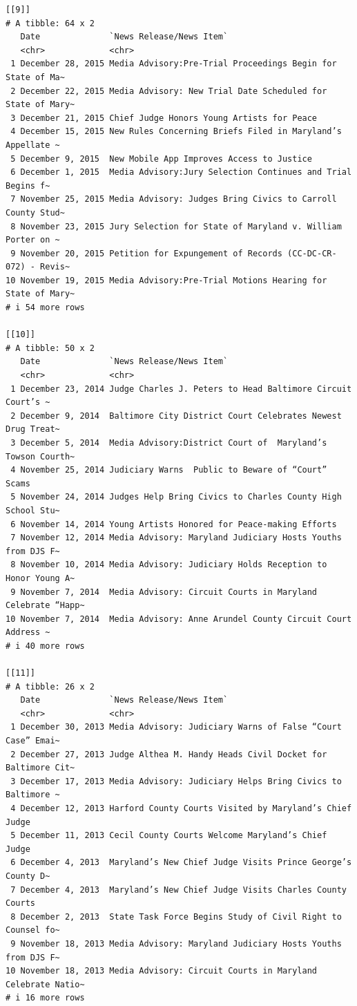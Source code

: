 \documentclass[
  letterpaper,
  DIV=11,
  numbers=noendperiod]{scrreprt}
\begin{document}
\begin{verbatim}
[[9]]
# A tibble: 64 x 2
   Date              `News Release/News Item`                                   
   <chr>             <chr>                                                      
 1 December 28, 2015 Media Advisory:Pre-Trial Proceedings Begin for State of Ma~
 2 December 22, 2015 Media Advisory: New Trial Date Scheduled for State of Mary~
 3 December 21, 2015 Chief Judge Honors Young Artists for Peace                 
 4 December 15, 2015 New Rules Concerning Briefs Filed in Maryland’s Appellate ~
 5 December 9, 2015  New Mobile App Improves Access to Justice                  
 6 December 1, 2015  Media Advisory:Jury Selection Continues and Trial Begins f~
 7 November 25, 2015 Media Advisory: Judges Bring Civics to Carroll County Stud~
 8 November 23, 2015 Jury Selection for State of Maryland v. William Porter on ~
 9 November 20, 2015 Petition for Expungement of Records (CC-DC-CR-072) - Revis~
10 November 19, 2015 Media Advisory:Pre-Trial Motions Hearing for State of Mary~
# i 54 more rows

[[10]]
# A tibble: 50 x 2
   Date              `News Release/News Item`                                   
   <chr>             <chr>                                                      
 1 December 23, 2014 Judge Charles J. Peters to Head Baltimore Circuit Court’s ~
 2 December 9, 2014  Baltimore City District Court Celebrates Newest Drug Treat~
 3 December 5, 2014  Media Advisory:District Court of  Maryland’s Towson Courth~
 4 November 25, 2014 Judiciary Warns  Public to Beware of “Court” Scams         
 5 November 24, 2014 Judges Help Bring Civics to Charles County High School Stu~
 6 November 14, 2014 Young Artists Honored for Peace-making Efforts             
 7 November 12, 2014 Media Advisory: Maryland Judiciary Hosts Youths from DJS F~
 8 November 10, 2014 Media Advisory: Judiciary Holds Reception to Honor Young A~
 9 November 7, 2014  Media Advisory: Circuit Courts in Maryland Celebrate “Happ~
10 November 7, 2014  Media Advisory: Anne Arundel County Circuit Court Address ~
# i 40 more rows

[[11]]
# A tibble: 26 x 2
   Date              `News Release/News Item`                                   
   <chr>             <chr>                                                      
 1 December 30, 2013 Media Advisory: Judiciary Warns of False “Court Case” Emai~
 2 December 27, 2013 Judge Althea M. Handy Heads Civil Docket for Baltimore Cit~
 3 December 17, 2013 Media Advisory: Judiciary Helps Bring Civics to Baltimore ~
 4 December 12, 2013 Harford County Courts Visited by Maryland’s Chief Judge    
 5 December 11, 2013 Cecil County Courts Welcome Maryland’s Chief  Judge        
 6 December 4, 2013  Maryland’s New Chief Judge Visits Prince George’s County D~
 7 December 4, 2013  Maryland’s New Chief Judge Visits Charles County Courts    
 8 December 2, 2013  State Task Force Begins Study of Civil Right to Counsel fo~
 9 November 18, 2013 Media Advisory: Maryland Judiciary Hosts Youths from DJS F~
10 November 18, 2013 Media Advisory: Circuit Courts in Maryland Celebrate Natio~
# i 16 more rows
\end{verbatim}
\end{document}
